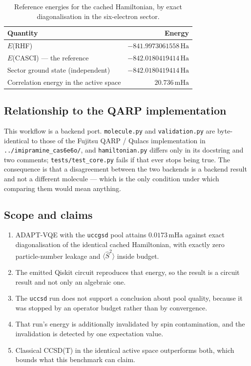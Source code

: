\documentclass[11pt,a4paper]{article}
\newcommand{\mHa}{\ensuremath{\,\mathrm{mHa}}}
\newcommand{\Ha}{\ensuremath{\,\mathrm{Ha}}}
\newcommand{\Ssq}{\ensuremath{\langle \hat{S}^2 \rangle}}
\newcommand{\code}[1]{\texttt{\small #1}}
\begin{document}
\begin{table}[htbp]
\centering
\caption{Reference energies for the cached Hamiltonian, by exact
diagonalisation in the six-electron sector.}
\label{tab:refs}
\small
\begin{tabular}{lr}
\toprule
Quantity & Energy \\
\midrule
$E$(RHF)                          & $-841.9973061558\Ha$ \\
$E$(CASCI) --- the reference      & $-842.0180419414\Ha$ \\
Sector ground state (independent) & $-842.0180419414\Ha$ \\
Correlation energy in the active space & $20.736\mHa$ \\
\bottomrule
\end{tabular}
\end{table}

\subsection{Relationship to the QARP implementation}

This workflow is a backend port. \code{molecule.py} and \code{validation.py} are
byte-identical to those of the Fujitsu QARP / Qulacs implementation in
\code{../imipramine\_cas6e6o/}, and \code{hamiltonian.py} differs only in its
docstring and two comments; \code{tests/test\_core.py} fails if that ever stops
being true. The consequence is that a disagreement between the two backends is a
backend result and not a different molecule --- which is the only condition
under which comparing them would mean anything.

\subsection{Scope and claims}

\begin{enumerate}[leftmargin=1.4em,itemsep=0.15em]
\item ADAPT-VQE with the \code{uccgsd} pool attains $0.0173\mHa$ against exact
  diagonalisation of the identical cached Hamiltonian, with exactly zero
  particle-number leakage and $\Ssq$ inside budget.
\item The emitted Qiskit circuit reproduces that energy, so the result is a
  circuit result and not only an algebraic one.
\item The \code{uccsd} run does not support a conclusion about pool quality,
  because it was stopped by an operator budget rather than by convergence.
\item That run's energy is additionally invalidated by spin contamination, and
  the invalidation is detected by one expectation value.
\item Classical CCSD(T) in the identical active space outperforms both, which
  bounds what this benchmark can claim.
\end{enumerate}
\end{document}
